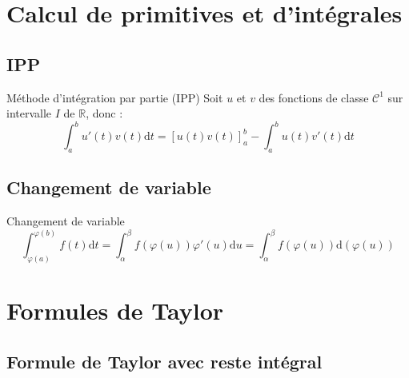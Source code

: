 \section{Calcul de primitives et d'intégrales} %
\label{sec:Calcul de primitives et d'intégrales}

\subsection{IPP} %
\label{sub:IPP}

\begin{Prop}{Méthode d'intégration par partie (IPP)}{}
Soit $u$ et $v$ des fonctions de classe $\mathcal{C} ^{1}$ sur intervalle $I$ de $\mathbb{R}$, donc :
\begin{equation}
  \int_{a}^{b} u'(t) v(t) \mathrm{d} t = [u(t)v(t)]_a ^{b} - \int_{a}^{b} u(t)v'(t) \mathrm{d}t
\end{equation}
\end{Prop}

\subsection{Changement de variable} %
\label{sub:Changement de variable}
\begin{Prop}{
    Changement de variable
  }{}
\begin{equation}
  \int_{\varphi(a)}^{\varphi(b)} f(t) \mathrm{d}t = \int_{\alpha}^{\beta} f(\varphi(u)) \varphi'(u) \mathrm{d}u = \int_{\alpha
  }^{\beta} f(\varphi(u)) \mathrm{d}(\varphi(u))
\end{equation}
\end{Prop}

















\section{Formules de Taylor} %
\label{sec:Formules de Taylor}

\subsection{Formule de Taylor avec reste intégral} %
\label{sub:Formule de Taylor avec reste intégral}

